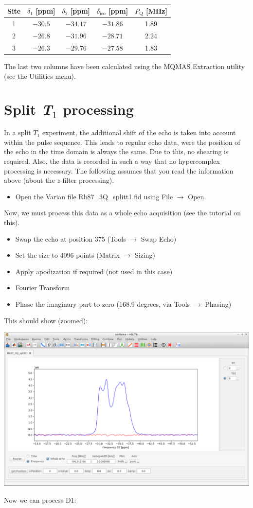 \documentclass[11pt,a4paper]{article}
\begin{document}
\begin{center}
  \begin{tabular}{c|cc| c c}
	 \toprule
	 Site & $\delta_1$ [ppm]& $\delta_2$ [ppm]& $\delta_\text{iso}$ [ppm]& $P_\text{Q}$ [MHz]  \\
	 \midrule
	 1 & $-30.5$ & $-34.17$ & $-31.86$ & 1.89 \\
	 2& $-26.8$ &$-31.96$  &$-28.71$ & 2.24\\
	 3& $-26.3$ &$-29.76$ & $-27.58$ & 1.83 \\
	\bottomrule
  \end{tabular}
\end{center}
The last two columns have been calculated using the MQMAS Extraction utility (see the Utilities
menu). 


\section{Split \textit{T}$_\text{1}$ processing}
In a split $T_\text{1}$ experiment, the additional shift of the echo is taken into account within
the pulse sequence. This leads to regular echo data, were the position of the echo in the time
domain is always the same. Due to this, no shearing is required. Also, the data is recorded in such
a way that no hypercomplex processing is necessary. The following assumes that you read the
information above (about the $z$-filter processing).

\begin{itemize}
	\item Open the Varian file Rb87\_3Q\_splitt1.fid using File $\longrightarrow$ Open
\end{itemize}
Now, we must process this data as a whole echo acquisition (see the tutorial on this).

\begin{itemize}
	\item Swap the echo at position 375 (Tools $\longrightarrow$ Swap Echo)
	\item Set the size to 4096 points (Matrix $\longrightarrow$ Sizing)
	\item Apply apodization if required (not used in this case)
	\item Fourier Transform
	\item Phase the imaginary part to zero (168.9 degrees, via Tools $\longrightarrow$ Phasing)
\end{itemize}
This should show (zoomed):
\begin{center}
\includegraphics[width=0.8\linewidth]{Figs/Fig9.png}
\end{center}
Now we can process D1:
\end{document}
